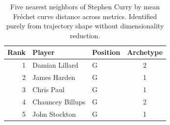 \begin{table}[htbp]
  \centering\small
  \begin{tabular}{rllc}
    \toprule
    Rank & Player & Position & Archetype \\
    \midrule
    1 & Damian Lillard & G & 2 \\
    2 & James Harden & G & 1 \\
    3 & Chris Paul & G & 1 \\
    4 & Chauncey Billups & G & 2 \\
    5 & John Stockton & G & 1 \\
    \bottomrule
  \end{tabular}
  \caption{Five nearest neighbors of Stephen Curry by mean Fr\'{e}chet curve distance across metrics. Identified purely from trajectory shape without dimensionality reduction.}
  \label{tab:Stephen_Curry_frechet_curve_neighbors}
\end{table}

